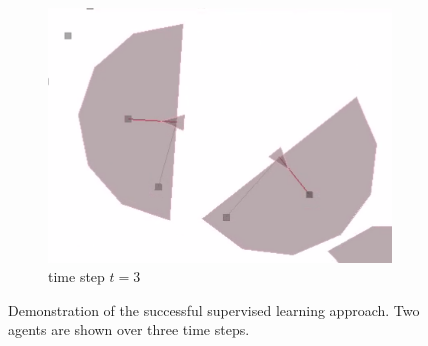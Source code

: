 \documentclass[10pt,a4paper,DIV=11]{scrreprt}
\begin{document}
\begin{figure}[H]
\begin{subfigure}{.3\textwidth}
  \includegraphics[width=\linewidth]{files/action/3.png}
  \caption{time step $t=3$}
  \label{fig:a3}
\end{subfigure}
\caption{Demonstration of the successful supervised learning approach.
         Two agents are shown over three time steps.}
\label{fig:action}
\end{figure}
\end{document}
